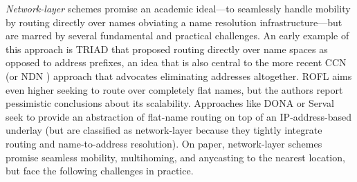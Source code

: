{{\em Network-layer} schemes promise an academic ideal---to seamlessly handle mobility by routing directly over names obviating a name resolution infrastructure---but are marred by several fundamental and practical challenges. An early example of this approach is TRIAD \cite{TRIAD} that proposed routing directly over name spaces as opposed to address prefixes, an idea that is also central to the more recent CCN \cite{CCN} (or NDN \cite{NDN}) approach that advocates eliminating addresses altogether. ROFL \cite{ROFL} aims even higher seeking to route over completely flat names, but the authors report pessimistic conclusions about its scalability. Approaches like DONA \cite{DONA} or Serval \cite{serval} seek to provide an abstraction of flat-name routing on top of an IP-address-based underlay (but are classified as network-layer because they tightly integrate routing and name-to-address resolution). On paper, network-layer schemes promise seamless mobility, multihoming, and anycasting to the nearest location, but face the following challenges in practice.



}
